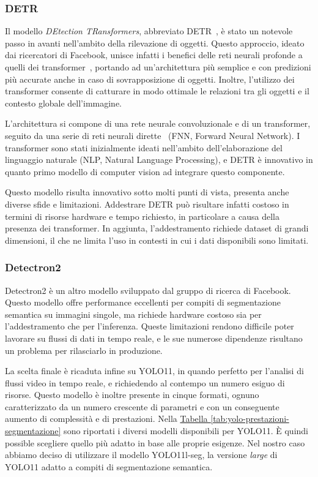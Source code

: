 \documentclass[12pt]{report}
\begin{document}
\subsubsection{DETR}
\label{sec:detr}

Il modello \textit{DEtection TRansformers}, abbreviato DETR~\cite{carion2020end}, è stato un notevole passo in avanti nell'ambito della rilevazione di oggetti. Questo approccio, ideato dai ricercatori di Facebook, unisce infatti i benefici delle reti neurali profonde a quelli dei transformer~\cite{10.1145/3505244}, portando ad un'architettura più semplice e con predizioni più accurate anche in caso di sovrapposizione di oggetti. Inoltre, l'utilizzo dei transformer consente di catturare in modo ottimale le relazioni tra gli oggetti e il contesto globale dell'immagine.

L'architettura si compone di una rete neurale convoluzionale e di un transformer, seguito da una serie di reti neurali dirette~\cite{article_890416} (FNN, Forward Neural Network). I transformer sono stati inizialmente ideati nell'ambito dell'elaborazione del linguaggio naturale (NLP, Natural Language Processing), e DETR è innovativo in quanto primo modello di computer vision ad integrare questo componente.

Questo modello risulta innovativo sotto molti punti di vista, presenta anche diverse sfide e limitazioni. Addestrare DETR può risultare infatti costoso in termini di risorse hardware e tempo richiesto, in particolare a causa della presenza dei transformer. In aggiunta, l'addestramento richiede dataset di grandi dimensioni, il che ne limita l'uso in contesti in cui i dati disponibili sono limitati.

\subsubsection{Detectron2}
\label{sec:detectron}

Detectron2 è un altro modello sviluppato dal gruppo di ricerca di Facebook. Questo modello offre performance eccellenti per compiti di segmentazione semantica su immagini singole, ma richiede hardware costoso sia per l'addestramento che per l'inferenza. Queste limitazioni rendono difficile poter lavorare su flussi di dati in tempo reale, e le sue numerose dipendenze risultano un problema per rilasciarlo in produzione.

\vspace{10pt}

La scelta finale è ricaduta infine su YOLO11, in quando perfetto per l'analisi di flussi video in tempo reale, e richiedendo al contempo un numero esiguo di risorse. Questo modello è inoltre presente in cinque formati, ognuno caratterizzato da un numero crescente di parametri e con un conseguente aumento di complessità e di prestazioni. Nella \hyperref[tab:yolo-prestazioni-segmentazione]{Tabella \ref{tab:yolo-prestazioni-segmentazione}} sono riportati i diversi modelli disponibili per YOLO11. È quindi possible scegliere quello più adatto in base alle proprie esigenze. Nel nostro caso abbiamo deciso di utilizzare il modello YOLO11l-seg, la versione \textit{large} di YOLO11 adatto a compiti di segmentazione semantica.
\end{document}
